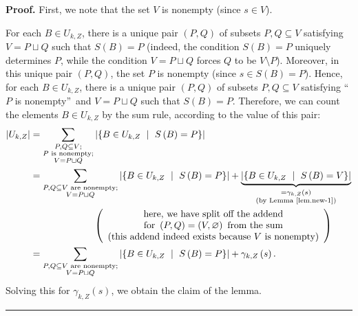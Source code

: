 \documentclass[numbers=enddot,12pt,final,onecolumn,notitlepage]{scrartcl}%
\theoremstyle{definition}
\newenvironment{proof}[1][Proof]{\noindent\textbf{#1.} }{\ \rule{0.5em}{0.5em}}
\let\sumnonlimits\sum
\renewcommand{\sum}{\sumnonlimits\limits}
\theoremstyle{plainsl}
\begin{document}
\begin{proof}
First, we note that the set $V$ is nonempty (since $s\in V$).

For each $B\in U_{k,Z}$, there is a unique pair $\left(  P,Q\right)  $ of
subsets $P,Q\subseteq V$ satisfying $V=P\sqcup Q$ such that $S\left(
B\right)  =P$ (indeed, the condition $S\left(  B\right)  =P$ uniquely
determines $P$, while the condition $V=P\sqcup Q$ forces $Q$ to be $V\setminus
P$). Moreover, in this unique pair $\left(  P,Q\right)  $, the set $P$ is
nonempty (since $s\in S\left(  B\right)  =P$). Hence, for each $B\in U_{k,Z}$,
there is a unique pair $\left(  P,Q\right)  $ of subsets $P,Q\subseteq V$
satisfying \textquotedblleft$P$ is nonempty\textquotedblright\ and $V=P\sqcup
Q$ such that $S\left(  B\right)  =P$. Therefore, we can count the elements
$B\in U_{k,Z}$ by the sum rule, according to the value of this pair:%
\begin{align*}
\left\vert U_{k,Z}\right\vert  &  =\sum_{\substack{P,Q\subseteq V;\\P\text{ is
nonempty;}\\V=P\sqcup Q}}\left\vert \left\{  B\in U_{k,Z}\ \mid\ S\left(
B\right)  =P\right\}  \right\vert \\
&  =\sum_{\substack{P,Q\subseteq V\text{ are nonempty;}\\V=P\sqcup
Q}}\left\vert \left\{  B\in U_{k,Z}\ \mid\ S\left(  B\right)  =P\right\}
\right\vert +\underbrace{\left\vert \left\{  B\in U_{k,Z}\ \mid\ S\left(
B\right)  =V\right\}  \right\vert }_{\substack{=\gamma_{k,Z}\left(  s\right)
\\\text{(by Lemma \ref{lem.new-1})}}}\\
&  \ \ \ \ \ \ \ \ \ \ \ \ \ \ \ \ \ \ \ \ \left(
\begin{array}
[c]{c}%
\text{here, we have split off the addend}\\
\text{for }\left(  P,Q\right)  =\left(  V,\varnothing\right)  \text{ from the
sum}\\
\text{(this addend indeed exists because }V\text{ is nonempty)}%
\end{array}
\right) \\
&  =\sum_{\substack{P,Q\subseteq V\text{ are nonempty;}\\V=P\sqcup
Q}}\left\vert \left\{  B\in U_{k,Z}\ \mid\ S\left(  B\right)  =P\right\}
\right\vert +\gamma_{k,Z}\left(  s\right)  .
\end{align*}
Solving this for $\gamma_{k,Z}\left(  s\right)  $, we obtain the claim of the lemma.
\end{proof}
\end{document}
